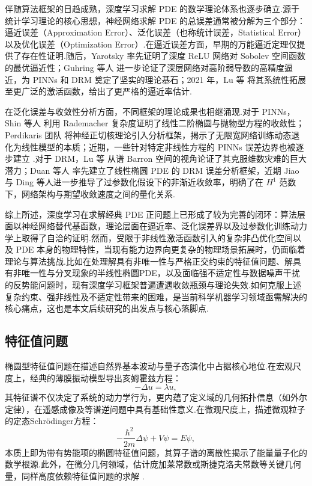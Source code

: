 伴随算法框架的日趋成熟，深度学习求解 PDE 的数学理论体系也逐步确立.源于统计学习理论的核心思想，神经网络求解 PDE 的总误差通常被分解为三个部分：逼近误差（Approximation Error）、泛化误差（也称统计误差，Statistical Error）以及优化误差（Optimization Error）\cite{mishra2023estimates}.在逼近误差方面，早期的万能逼近定理仅提供了存在性证明.随后，Yarotsky \cite{yarotsky2017error,yarotsky2018optimal} 率先证明了深度 ReLU 网络对 Sobolev 空间函数的最优逼近性；Guhring 等人 \cite{guhring2020error} 进一步论证了深层网络对高阶弱导数的高精度逼近，为 PINNs 和 DRM 奠定了坚实的理论基石；2021 年，Lu 等 \cite{lu2021deep} 将其系统性拓展至更广泛的激活函数，给出了更严格的逼近率估计.

在泛化误差与收敛性分析方面，不同框架的理论成果也相继涌现.对于 PINNs，Shin 等人 \cite{shin2020convergence} 利用 Rademacher 复杂度证明了线性二阶椭圆与抛物型方程的收敛性；Perdikaris 团队 \cite{wang2022and,wang2021understanding} 将神经正切核理论引入分析框架，揭示了无限宽网络训练动态退化为线性模型的本质；近期，一些针对特定非线性方程的 PINNs 误差边界也被逐步建立 \cite{zhang2024priori,de2024error,qian2023physics}.对于 DRM，Lu 等 \cite{lu2021priorieigen} 从谱 Barron 空间的视角论证了其克服维数灾难的巨大潜力；Duan 等人 \cite{duan2022convergence} 率先建立了线性椭圆 PDE 的 DRM 误差分析框架，近期 Jiao \cite{jiao2024error,jiao2025error} 与 Ding \cite{ding2025convergence} 等人进一步推导了过参数化假设下的非渐近收敛率，明确了在 $H^1$ 范数下，网络架构与期望收敛速度之间的量化关系.

综上所述，深度学习在求解经典 PDE 正问题上已形成了较为完善的闭环：算法层面以神经网络替代基函数，理论层面在逼近率、泛化误差界以及过参数化训练动力学上取得了自洽的证明.然而，受限于非线性激活函数引入的复杂非凸优化空间以及 PDE 本身的物理特性，当现有能力边界向更复杂的物理场景拓展时，仍面临着理论与算法挑战.比如在处理解具有非唯一性与严格正交约束的特征值问题、解具有非唯一性与分叉现象的半线性椭圆PDE，以及面临强不适定性与数据噪声干扰的反势能问题时，现有深度学习框架普遍遭遇收敛瓶颈与理论失效.如何克服上述复杂约束、强非线性及不适定性带来的困难，是当前科学机器学习领域亟需解决的核心痛点，这也是本文后续研究的出发点与核心落脚点.


\subsection{特征值问题}
椭圆型特征值问题在描述自然界基本波动与量子态演化中占据核心地位.在宏观尺度上，经典的薄膜振动模型导出亥姆霍兹方程：
$$-\Delta u = \lambda u,$$
其特征谱不仅决定了系统的动力学行为，更内蕴了定义域的几何拓扑信息（如外尔定律），在遥感成像及等谱逆问题中具有基础性意义.在微观尺度上，描述微观粒子的定态Schr\"{o}dinger方程\cite{li1983schrodinger}：
$$-\frac{\hbar^2}{2m}\Delta \psi + V\psi = E\psi,$$
本质上即为带有势能项的椭圆特征值问题，其算子谱的离散性揭示了能量量子化的数学根源.此外，在微分几何领域，估计庞加莱常数或斯捷克洛夫常数等关键几何量，同样高度依赖特征值问题的求解 \cite{HAN2019108929,johnson2004convergence,courtade2020bounds}.

